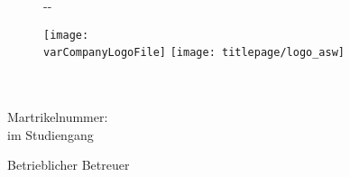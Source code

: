\makeatletter
\begin{titlepage}
    \begin{figure}[t]
        \begin{adjustwidth}{-\oddsidemargin-1in}{-\rightmargin}
            
            \minipage{0pt}
              \noindent
            \endminipage
            
            \minipage{0.1\paperwidth}
              \hfill
            \endminipage
            \minipage{0.25\paperwidth}
                \ifdefined\varCompanyLogoFile
                  \vspace{\varTitlepageLogoMarginTop}
                  \texttt{[image: \\varCompanyLogoFile]}
                \else
                  \hfill
                \fi             
            \endminipage
            \minipage{0.3\paperwidth}
                \hfill
            \endminipage
            \minipage{0.25\paperwidth}
              \vspace{\varTitlepageLogoMarginTop}    
              \texttt{[image: titlepage/logo\_asw]}
            \endminipage

        \end{adjustwidth}
    \end{figure}

    \vspace*{2cm}

    \begin{flushleft}
        \Huge
        \textbf{\@title}\\[2cm]

        \LARGE
        \textbf{\@author}\\[0.5cm]

        \large
        Martrikelnummer: \varMartrikelnummer \\[0.5cm]

        \Large
        \varArbeit im Studiengang\\
        \varStudiengang
    \end{flushleft}

    \vspace{0.5cm}

    \begin{flushright}
        Betrieblicher Betreuer\\
        \varBetrBetreuer\\[0.5cm]


\end{flushright}
\end{titlepage}
